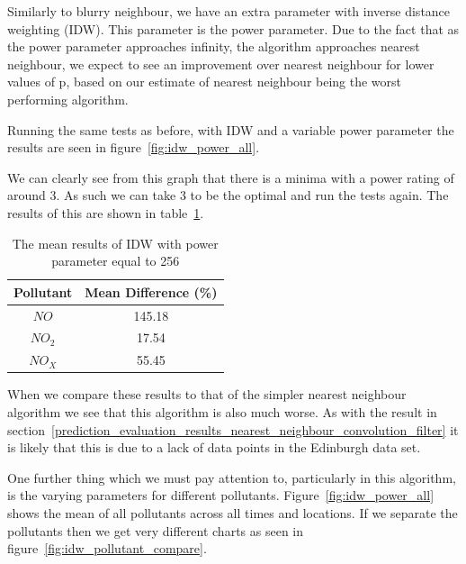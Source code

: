 
        	Similarly to blurry neighbour, we have an extra parameter with inverse distance weighting (IDW). This parameter is the power parameter. Due to the fact that as the power parameter approaches infinity, the algorithm approaches nearest neighbour, we expect to see an improvement over nearest neighbour for lower values of p, based on our estimate of nearest neighbour being the worst performing algorithm.

        	Running the same tests as before, with IDW and a variable power parameter the results are seen in figure~\ref{fig:idw_power_all}.


        	We can clearly see from this graph that there is a minima with a power rating of around 3. As such we can take 3 to be the optimal and run the tests again. The results of this are shown in table~\ref{tab:idw_results}.

        	\begin{table}
				\centering
	    		\begin{tabular}{|c|c|}
	    			\hline
					Pollutant & Mean Difference (\%) \\ \hline
					$NO$ & 145.18 \\
					$NO_{2}$ & 17.54 \\
					$NO_{X}$ & 55.45 \\
					\hline
				\end{tabular}
				\caption{The mean results of IDW with power parameter equal to 256}
				\label{tab:idw_results}
			\end{table}

			When we compare these results to that of the simpler nearest neighbour algorithm we see that this algorithm is also much worse. As with the result in section~\ref{prediction_evaluation_results_nearest_neighbour_convolution_filter} it is likely that this is due to a lack of data points in the Edinburgh data set.

			One further thing which we must pay attention to, particularly in this algorithm, is the varying parameters for different pollutants. Figure~\ref{fig:idw_power_all} shows the mean of all pollutants across all times and locations. If we separate the pollutants then we get very different charts as seen in figure~\ref{fig:idw_pollutant_compare}.


